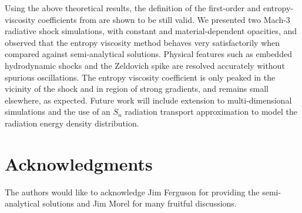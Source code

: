 \documentclass[times,doublespace]{fldauth}%
\begin{document}
Using the above theoretical results, the definition of the first-order and entropy-viscosity coefficients from \cite{our_jcp_radhy_paper} are shown to be still valid. We presented two Mach-3 radiative shock simulations, with constant and material-dependent opacities, and observed that the entropy viscosity method behaves very satisfactorily when compared against semi-analytical solutions. Physical features such as embedded hydrodynamic shocks and the Zeldovich spike are resolved accurately without spurious oscillations. The entropy viscosity coefficient is only peaked in the vicinity of the shock and in region of strong gradients, and remains small elsewhere, as expected. 
%
Future work will include extension to multi-dimensional simulations and the use of an $S_n$ radiation transport approximation to model the radiation energy density distribution.



\section*{Acknowledgments}
The authors would like to acknowledge Jim Ferguson for providing the semi-analytical solutions and Jim Morel for many fruitful discussions. 




\end{document}
